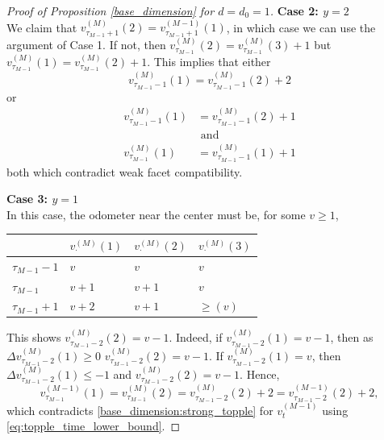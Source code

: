 \documentclass[12pt]{amsart}
\begin{document}
\begin{proof}[Proof of Proposition \ref{base_dimension} for $d=d_0 = 1$]
		
		{\bf Case 2: $y = 2$} \\
		We claim that $v_{\tau_{M-1}+1}^{(M)}(2) = v_{\tau_{M-1}+1}^{(M-1)}(1)$, in which 
		case we can use the argument of Case 1. If not, then $v_{\tau_{M-1}}^{(M)}(2) = v_{\tau_{M-1}}^{(M)}(3)+1$
		but $v_{\tau_{M-1}}^{(M)}(1) = v_{\tau_{M-1}}^{(M)}(2)+1$. This implies that either 
		\[
		v_{\tau_{M-1}-1}^{(M)}(1) = v_{\tau_{M-1}-1}^{(M)}(2)+2
		\]
		or
		\begin{align*}
		v_{\tau_{M-1}-1}^{(M)}(1) &= v_{\tau_{M-1}-1}^{(M)}(2)+1 \\
		 &\mbox{ and }  \\  
		v_{\tau_{M-1}}^{(M)}(1) &= v_{\tau_{M-1}-1}^{(M)}(1)+1
		\end{align*}
		both which contradict weak facet compatibility. 


		{\bf Case 3: $y = 1$} \\
		In this case, the odometer near the center must be, for some $v \geq 1$,
			\begin{center}
			\begin{tabular}{l | l | l | l }
				& $v_{\cdot}^{(M)}(1)$ & $v_{\cdot}^{(M)}(2)$ & $v_{\cdot}^{(M)}(3)$ \\  \hline
				$\tau_{M-1}-1$ & $v$ & $v$ & $v$    \\
				$\tau_{M-1}$  & $v+1$ & $v+1$  & $v$  \\   
				$\tau_{M-1}+1$  & $v+2$ & $v+1$ & $\geq (v)$
			\end{tabular}
		\end{center}
		This shows $v^{(M)}_{\tau_{M-1}-2}(2) = v-1$. Indeed, 
		if $v^{(M)}_{\tau_{M-1}-2}(1) = v-1$, then as $\Delta v^{(M)}_{\tau_{M-1}-2}(1) \geq 0$
		 $v^{(M)}_{\tau_{M-1}-2}(2) = v-1$. If $v^{(M)}_{\tau_{M-1}-2}(1) = v$, then $\Delta v^{(M)}_{\tau_{M-1}-2}(1) \leq -1$ and $v^{(M)}_{\tau_{M-1}-2}(2) = v-1$. Hence, 
		 \[
		 v^{(M-1)}_{\tau_{M-1}}(1) = v^{(M)}_{\tau_{M-1}}(2) = v^{(M)}_{\tau_{M-1}-2}(2)+2= v^{(M-1)}_{\tau_{M-1}-2}(2)+2,
		 \]
		 which contradicts \eqref{base_dimension:strong_topple} for $v_t^{(M-1)}$ using \eqref{eq:topple_time_lower_bound}.


	\end{proof}
	
\end{document}
